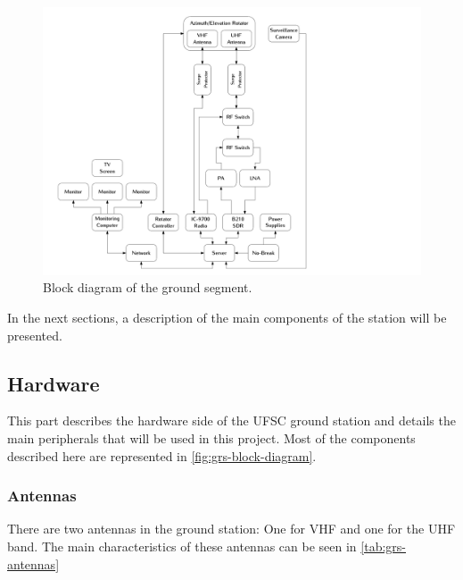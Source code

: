 \begin{figure}[!ht]
    \begin{center}
        \includegraphics[width=\textwidth]{figures/grs-block-diagram.pdf}
        \caption{Block diagram of the ground segment.}
        \label{fig:grs-block-diagram}
    \end{center}
\end{figure}

In the next sections, a description of the main components of the station will be presented.

\subsection{Hardware}

This part describes the hardware side of the UFSC ground station and details the main peripherals that will be used in this project. Most of the components described here are represented in \autoref{fig:grs-block-diagram}.

\subsubsection{Antennas}

There are two antennas in the ground station: One for VHF and one for the UHF band. The main characteristics of these antennas can be seen in \autoref{tab:grs-antennas}


